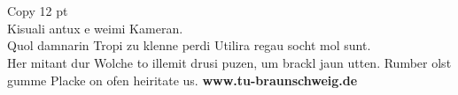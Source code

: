 \documentclass[a3paper,13pt]{tubsposter}
\begin{document}
\begin{tubsposter}
  \showtubslogo[right]
  \begin{posterrow}[bgcolor=tuGreenDark]{2}
    ~
  \end{posterrow}
  \begin{posterrow}[bgimage=titlepicture.jpg]{3}
    ~
  \end{posterrow}
  \begin{posterrow}[bgcolor=tuBlueDark20]{3}
    Copy 12 pt\\
    Kisuali antux e weimi Kameran.\\
    Quol damnarin Tropi zu klenne perdi Utilira regau socht mol sunt.\\
    Her mitant dur Wolche to illemit drusi puzen, um brackl jaun utten. Rumber olst gumme Placke on ofen heiritate us.
    \vfill
    \textbf{www.tu-braunschweig.de}
  \end{posterrow}
\end{tubsposter}
\end{document}
